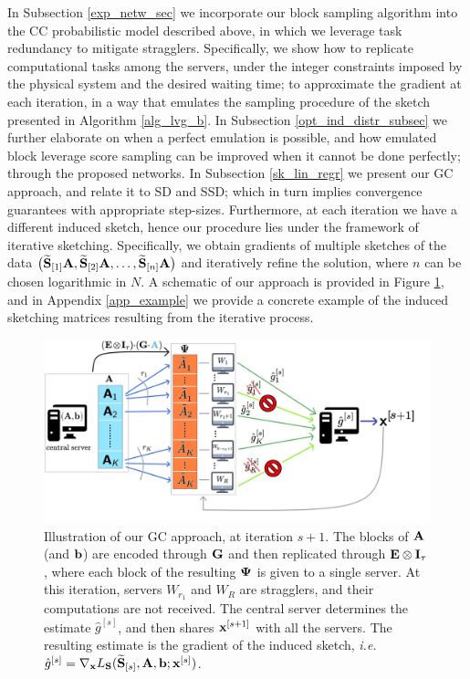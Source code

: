 \documentclass[journal,letterpaper,onecolumn,twoside,nofonttune]{IEEEtran}
\newcommand{\bb}{\bold{b}}
\newcommand{\xb}{\bold{x}}
\newcommand{\Ab}{\bold{A}}
\newcommand{\Eb}{\bold{E}}
\newcommand{\Gb}{\bold{G}}
\newcommand{\Ib}{\bold{I}}
\newcommand{\Sb}{\bold{S}}
\newcommand{\Sbwt}{\widetilde{\Sb}}
\newcommand{\gh}{\hat{g}}
\newcommand{\PsiB}{\bold{\Psi}}
\begin{document}
In Subsection \ref{exp_netw_sec} we incorporate our block sampling algorithm into the CC probabilistic model described above, in which we leverage task redundancy to mitigate stragglers. Specifically, we show how to replicate computational tasks among the servers, under the integer constraints imposed by the physical system and the desired waiting time; to approximate the gradient at each iteration, in a way that emulates the sampling procedure of the sketch presented in Algorithm \ref{alg_lvg_b}. In Subsection \ref{opt_ind_distr_subsec} we further elaborate on when a perfect emulation is possible, and how emulated block leverage score sampling can be improved when it cannot be done perfectly; through the proposed networks. In Subsection \ref{sk_lin_regr} we present our GC approach, and relate it to SD and SSD; which in turn implies convergence guarantees with appropriate step-sizes. Furthermore, at each iteration we have a different induced sketch, hence our procedure lies under the framework of iterative sketching. Specifically, we obtain gradients of multiple sketches of the data
$\big(\Sbwt_{[1]}\Ab,\Sbwt_{[2]}\Ab,\ldots,\Sbwt_{[n]}\Ab\big)$ and iteratively refine the solution, where $n$ can be chosen logarithmic in $N$. A schematic of our approach is provided in Figure \ref{GC_block_lvg_schematic}, and in Appendix \ref{app_example} we provide a concrete example of the induced sketching matrices resulting from the iterative process.
\begin{figure}[h]
  \centering
  \includegraphics[scale=.15]{GC_lvg_score_schematic_final.png}
  \caption{Illustration of our GC approach, at iteration $s+1$. The blocks of $\Ab$ (and $\bb$) are encoded through $\Gb$ and then replicated through $\Eb\otimes\Ib_\tau$, where each block of the resulting $\PsiB$ is given to a single server. At this iteration, servers $W_{r_1}$ and $W_{R}$ are stragglers, and their computations are not received. The central server determines the estimate $\gh^{[s]}$, and then shares $\xb^{[s+1]}$ with all the servers. The resulting estimate is the gradient of the induced sketch, \textit{i.e.} $\gh^{[s]}=\nabla_\xb L_{\Sb}(\Sbwt_{[s]},\Ab,\bb;\xb^{[s]})$.}
  \label{GC_block_lvg_schematic}
\end{figure}
\end{document}
